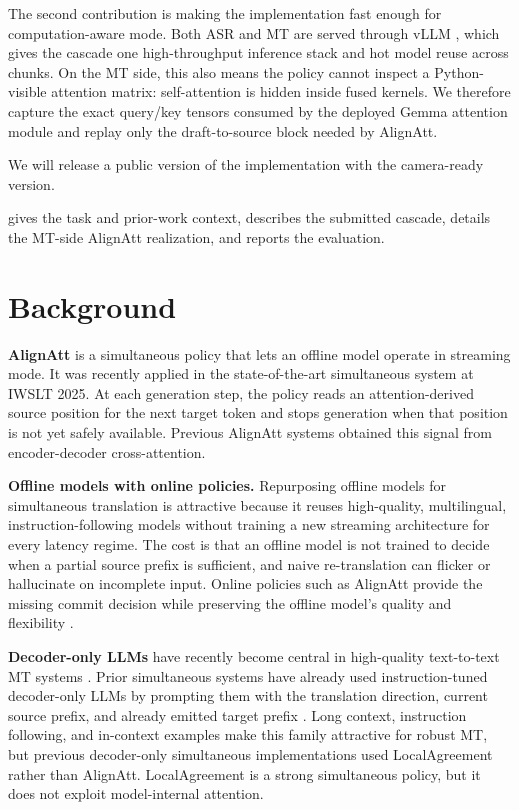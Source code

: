 \documentclass[11pt]{article}
\begin{document}
The second contribution is making the implementation fast enough for
computation-aware mode. Both ASR and MT are served through vLLM \citep{vllm23},
which gives the cascade one high-throughput inference stack and hot model reuse
across chunks. On the MT side, this also means the policy cannot inspect a
Python-visible attention matrix: self-attention is hidden inside fused kernels.
We therefore capture the exact query/key tensors
consumed by the deployed Gemma attention module and replay only the
draft-to-source block needed by AlignAtt.

We will release a public version of the implementation with the camera-ready
version.

 gives the task and prior-work context,
 describes the submitted cascade,
 details the MT-side AlignAtt realization, and
 reports the evaluation.

\section{Background}
\label{sec:background}

\textbf{AlignAtt} \citep{alignatt23,streamatt24} is a simultaneous policy that
lets an offline model operate in streaming mode. It was recently applied in the
state-of-the-art simultaneous system \citep{cuniiwslt25} at IWSLT 2025. At each generation step, the
policy reads an attention-derived source position for the next target token and
stops generation when that position is not yet safely available. Previous
AlignAtt systems obtained this signal from encoder-decoder cross-attention.

\textbf{Offline models with online policies.} Repurposing offline models for
simultaneous translation is attractive because it reuses high-quality,
multilingual, instruction-following models without training a new streaming
architecture for every latency regime. The cost is that an offline model is not
trained to decide when a partial source prefix is sufficient, and naive
re-translation can flicker or hallucinate on incomplete input. Online policies
such as AlignAtt provide the missing commit decision while preserving the
offline model's quality and flexibility \citep{alignatt23,cuniiwslt25}.

\textbf{Decoder-only LLMs} have recently become central in high-quality
text-to-text MT systems \citep{kocmi-etal-2024-findings,kocmi-etal-2025-findings}.
Prior simultaneous systems have already used instruction-tuned decoder-only
LLMs by prompting them with the translation direction, current source prefix,
and already emitted target prefix \citep{cuniiwslt25}. Long context,
instruction following, and in-context examples make this family attractive for
robust MT, but previous decoder-only simultaneous implementations used
LocalAgreement \citep{polak-etal-2022-cuni,polak23_interspeech} rather than
AlignAtt. LocalAgreement is a strong simultaneous policy, but it does not
exploit model-internal attention.
\end{document}
